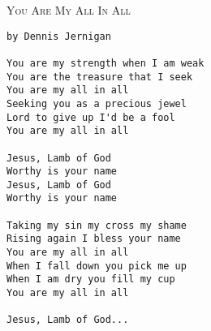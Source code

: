 \documentclass[10pt,oneside,footinclude=true,headinclude=true]{scrbook} %
\makeatletter
\newcommand{\verbatimfont}[1]{\renewcommand{\verbatim@font}{#1}}
\newcommand\songtitle[1]{
	\hspace*{-3.7mm}\Large\textsc{#1}
}
\makeatother
\begin{document}
\pagestyle{empty}
\verbatimfont{\rmfamily\large}

%
%
%
%
%
%    



\newpage
\bigskip
\songtitle{You Are My All In All}
\begin{verbatim}
by Dennis Jernigan

You are my strength when I am weak
You are the treasure that I seek
You are my all in all
Seeking you as a precious jewel
Lord to give up I'd be a fool
You are my all in all

Jesus, Lamb of God
Worthy is your name
Jesus, Lamb of God
Worthy is your name

Taking my sin my cross my shame
Rising again I bless your name
You are my all in all
When I fall down you pick me up
When I am dry you fill my cup
You are my all in all

Jesus, Lamb of God...

\end{verbatim}

\end{document}
